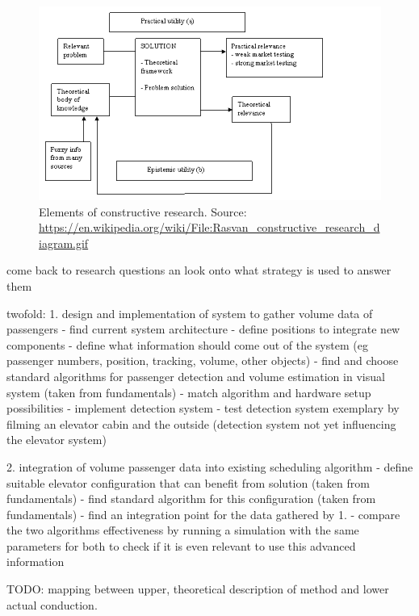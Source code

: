 \begin{figure}[hbt]
	\centering
	\includegraphics[width=1.0\textwidth, keepaspectratio]{resources/Rasvan_constructive_research_diagram}
	\caption{\label{fig:design:constructiveresearch} Elements of constructive research. Source:
	\url{https://en.wikipedia.org/wiki/File:Rasvan_constructive_research_diagram.gif}}
\end{figure}


come back to research questions an look onto what strategy is used to answer them

twofold:
1. design and implementation of system to gather volume data of passengers
 - find current system architecture
 - define positions to integrate new components
 - define what information should come out of the system
 (eg passenger numbers, position, tracking, volume, other objects)
 - find and choose standard algorithms for passenger detection and volume estimation in visual system (taken from fundamentals)
 - match algorithm and hardware setup possibilities
 - implement detection system
 - test detection system exemplary by filming an elevator cabin and the outside (detection system not yet influencing the elevator system)
 
2. integration of volume passenger data into existing scheduling algorithm
 - define suitable elevator configuration that can benefit from solution (taken from fundamentals) 
 - find standard algorithm for this configuration (taken from fundamentals)
 - find an integration point for the data gathered by 1.
 - compare the two algorithms effectiveness by running a simulation with the same parameters for both to check if it is even relevant to use this advanced information
 
 TODO: mapping between upper, theoretical description of method and  lower actual conduction.
 
